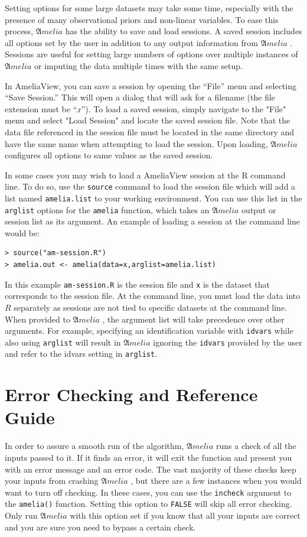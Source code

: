 \documentclass[12pt,titlepage]{article}
\newcommand{\Amelia}{\ensuremath{\mathfrak Amelia} }
\begin{document}
Setting options for some large datasets may take some time, especially
with the presence of many observational priors and non-linear
variables.  To ease this process, \Amelia has the ability to save and
load sessions.  A saved session includes all options set by the user
in addition to any output information from \Amelia.  Sessions are
useful for setting large numbers of options over multiple instances of
\Amelia or imputing the data multiple times with the same setup.

In AmeliaView, you can save a session by opening the ``File'' menu and
selecting ``Save Session.''  This will open a dialog that will ask for
a filename (the file extension must be ``.r'').  To load a saved
session, simply navigate to the "File" menu and select "Load Session"
and locate the saved session file.  Note that the data file referenced
in the session file must be located in the same directory and have the
same name when attempting to load the session.  Upon loading, \Amelia
configures all options to same values as the saved session.

In some cases you may wish to load a AmeliaView session at the R
command line.  To do so, use the \texttt{source} command to load the
session file which will add a list named \texttt{amelia.list} to your
working environment.  You can use this list in the \texttt{arglist}
options for the \texttt{amelia} function, which takes an \Amelia output
or session list as its argument.  An example of loading a session at the command
line would be:



\begin{verbatim}
> source("am-session.R") 
> amelia.out <- amelia(data=x,arglist=amelia.list)
\end{verbatim}

In this example \texttt{am-session.R} is the session file and
\texttt{x} is the dataset that corresponds to the session file.  At
the command line, you must load the data into $R$ separately as sessions
are not tied to specific datasets at the command line.  When provided
to \Amelia, the argument list will take precedence over other
arguments.  For example, specifying an identification variable with
\texttt{idvars} while also using \texttt{arglist} will result in
\Amelia ignoring the \texttt{idvars} provided by the user and refer to
the idvars setting in \texttt{arglist}.

\section{Error Checking and Reference Guide}
\label{sec:errors}
In order to assure a smooth run of the algorithm, \Amelia runs a check
of all the inputs passed to it.  If it finds an error, it will exit
the function and present you with an error message and an error code.
The vast majority of these checks keep your inputs from crashing
\Amelia, but there are a few instances when you would want to turn off
checking.  In these cases, you can use the \texttt{incheck} argument
to the \texttt{amelia()} function.  Setting this option to
\texttt{FALSE} will skip all error checking.  Only run \Amelia with
this option set if you know that all your inputs are correct and you
are sure you need to bypass a certain check.
\end{document}
